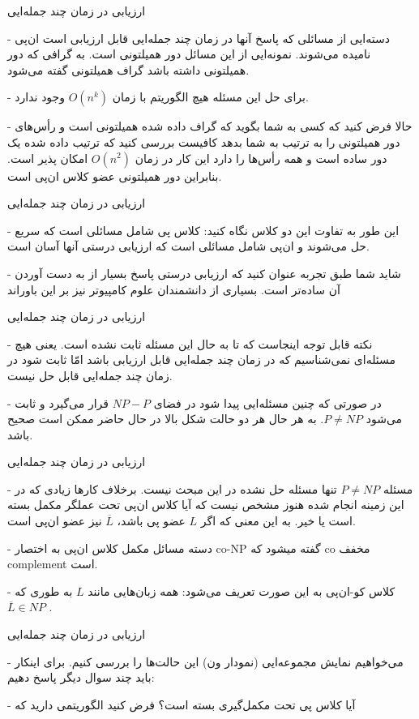 \begin{itemframe}{ارزیابی در زمان چند جمله‌ایی}
\item[-]
دسته‌ایی از مسائلی که پاسخ آنها در زمان چند جمله‌ایی قابل ارزیابی است ان‌پی نامیده می‌شوند. نمونه‌ایی از این مسائل دور همیلتونی است. به گرافی که دور همیلتونی داشته باشد گراف همیلتونی
 گفته می‌شود.
\item[-]
برای حل این مسئله هیچ الگوریتم با زمان
$O(n^k)$
وجود ندارد.
\item[-]
حالا فرض کنید که کسی به شما بگوید که گراف داده شده همیلتونی است و رأس‌های دور همیلتونی را به ترتیب به شما بدهد کافیست بررسی کنید که ترتیب داده شده یک دور ساده است و همه رأس‌ها را دارد این کار در زمان
$O(n^2)$
امکان پذیر است. بنابراین دور همیلتونی عضو کلاس ان‌پی است.

\end{itemframe}

\begin{itemframe}{ارزیابی در زمان چند جمله‌ایی}
\item [-]
این طور به تفاوت این دو کلاس نگاه کنید:‌ کلاس پی شامل مسائلی است که سریع حل می‌شوند و ان‌پی شامل مسائلی است که ارزیابی درستی آنها آسان است.
\item [-]
شاید شما طبق تجربه عنوان کنید که ارزیابی درستی پاسخ بسیار از به دست آوردن آن ساده‌تر است. بسیاری از دانشمندان علوم کامپیوتر نیز بر این باوراند


\end{itemframe}

\begin{itemframe}{ارزیابی در زمان چند جمله‌ایی}
\item [-]
نکته قابل توجه اینجاست که تا به حال این مسئله ثابت نشده است. یعنی هیچ مسئله‌ای نمی‌شناسیم که در زمان چند جمله‌ایی قابل ارزیابی باشد امّا ثابت شود در زمان چند جمله‌ایی قابل حل نیست.


\item [-]
در صورتی که چنین مسئله‌ایی پیدا شود در فضای
$NP - P$
قرار می‌گیرد و ثابت می‌شود
$P \neq NP$.
به هر حال هر دو حالت شکل بالا در حال حاضر ممکن است صحیح باشد.
\end{itemframe}

\begin{itemframe}{ارزیابی در زمان چند جمله‌ایی}
\item [-]
مسئله
$P \neq NP$
تنها مسئله حل نشده در این مبحث نیست. برخلاف کار‌ها زیادی که در این زمینه انجام شده هنوز مشخص نیست که آیا کلاس ان‌پی تحت عملگر مکمل بسته است یا خیر. به این معنی که اگر
$L$
عضو پی باشد،
$\overline{L}$
نیز عضو ان‌پی است.
\item [-]
دسته مسائل مکمل کلاس ان‌پی به اختصار co-NP گفته میشود که co مخفف complement است.
\item [-]
کلاس کو-ان‌پی به این صورت تعریف می‌شود: همه زبان‌هایی مانند
$ L $
 به طوری که
$\overline{L} \in NP$ .

\end{itemframe}

\begin{itemframe}{ارزیابی در زمان چند جمله‌ایی}
\item [-]
می‌خواهیم نمایش مجموعه‌ایی (نمودار ون) این حالت‌ها را بررسی کنیم. برای اینکار باید چند سوال دیگر پاسخ دهیم:
\item [-]
آیا کلاس پی تحت مکمل‌گیری بسته است؟ فرض کنید الگوریتمی دارید که

\end{itemframe}